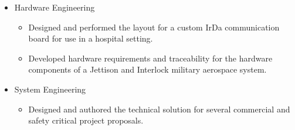 \documentclass[print]{template/friggeri-cv} %
\begin{document}
\begin{entrylist}
{\begin{itemize}
\begin{itemize}
\begin{itemize}
\item Created the testbench, bus functional models, and testcases for the verification of this device.
\item Implemented PSRAM, SRAM, SDRAM, DRAM, BT656, and Serial FLASH interfaces.
\end{itemize}
\item Obsolescence Updates
\begin{itemize}
\item Developed a custom PCI target, to replace and emulate several obsolete hardware components on a custom PCI-CAN board used in a ventilator in a medical setting.
\item Update of several FPGAs in various legacy military applications including a voice and data recorder (ARINC TBD) and an inertial reference system (GPS, Gyro Caging Control System).
\item Update of several FPGAs in a fuel quantity measurement system in use on the Boeing 777.  This update was certified to DO-254 level A standards and was completed 50\% under budget.  (ARINC TBD)
\end{itemize}
\end{itemize}
\item Hardware Engineering
\begin{itemize}
\item Designed and performed the layout for a custom IrDa communication board for use in a hospital setting.
\item Developed hardware requirements and traceability for the hardware components of a Jettison and Interlock military aerospace system.
\end{itemize}
\item System Engineering
\begin{itemize}
\item Designed and authored the technical solution for several commercial and safety critical project proposals.
\end{itemize}
\end{itemize}}

\end{entrylist}
\end{document}
